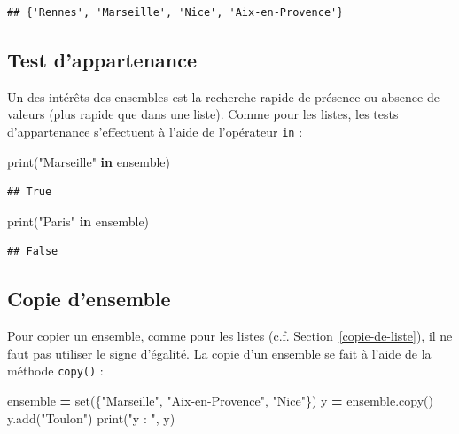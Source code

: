 \documentclass[12pt,]{book}
\newenvironment{Shaded}{\begin{snugshade}}{\end{snugshade}}
\newcommand{\KeywordTok}[1]{\textcolor[rgb]{0.13,0.29,0.53}{\textbf{#1}}}
\newcommand{\StringTok}[1]{\textcolor[rgb]{0.31,0.60,0.02}{#1}}
\newcommand{\OperatorTok}[1]{\textcolor[rgb]{0.81,0.36,0.00}{\textbf{#1}}}
\newcommand{\BuiltInTok}[1]{#1}
\newcommand{\NormalTok}[1]{#1}
\numberwithin{equation}{section}
\numberwithin{countremarque}{section}
\begin{document}
\begin{lstlisting}
## {'Rennes', 'Marseille', 'Nice', 'Aix-en-Provence'}
\end{lstlisting}

\subsection{Test d'appartenance}\label{test-dappartenance-1}

Un des intérêts des ensembles est la recherche rapide de présence ou
absence de valeurs (plus rapide que dans une liste). Comme pour les
listes, les tests d'appartenance s'effectuent à l'aide de l'opérateur
\texttt{in} :

\begin{Shaded}
\begin{Highlighting}[]
\BuiltInTok{print}\NormalTok{(}\StringTok{"Marseille"} \KeywordTok{in}\NormalTok{ ensemble)}
\end{Highlighting}
\end{Shaded}

\begin{lstlisting}
## True
\end{lstlisting}

\begin{Shaded}
\begin{Highlighting}[]
\BuiltInTok{print}\NormalTok{(}\StringTok{"Paris"} \KeywordTok{in}\NormalTok{ ensemble)}
\end{Highlighting}
\end{Shaded}

\begin{lstlisting}
## False
\end{lstlisting}

\subsection{Copie d'ensemble}\label{copie-densemble}

Pour copier un ensemble, comme pour les listes (c.f.
Section~\ref{copie-de-liste}), il ne faut pas utiliser le signe
d'égalité. La copie d'un ensemble se fait à l'aide de la méthode
\texttt{copy()} :

\begin{Shaded}
\begin{Highlighting}[]
\NormalTok{ensemble }\OperatorTok{=} \BuiltInTok{set}\NormalTok{(\{}\StringTok{"Marseille"}\NormalTok{, }\StringTok{"Aix-en-Provence"}\NormalTok{, }\StringTok{"Nice"}\NormalTok{\})}
\NormalTok{y }\OperatorTok{=}\NormalTok{ ensemble.copy()}
\NormalTok{y.add(}\StringTok{"Toulon"}\NormalTok{)}
\BuiltInTok{print}\NormalTok{(}\StringTok{"y : "}\NormalTok{, y)}
\end{Highlighting}
\end{Shaded}
\end{document}
